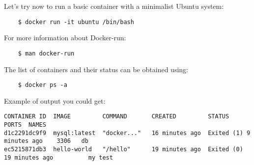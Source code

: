 \documentclass[handout]{beamer}[10pt, usepdftitle=false]
\begin{document}
	\begin{frame}[fragile]	
	
	Let's try now to run a basic container with a minimalist Ubuntu system:
	\vspace*{0.6em}
	
	\begin{verbatim}
	$ docker run -it ubuntu /bin/bash
	\end{verbatim}
	
	
	For more information about Docker-run:
	\vspace*{0.6em}	
	
	\begin{verbatim}
	$ man docker-run
	\end{verbatim}			
	
	The list of containers and their status can be obtained using:
	\vspace*{0.6em}
	
	\begin{verbatim}
	$ docker ps -a
	\end{verbatim}
	
	Example of output you could get:
	\vspace*{0.6em}
	
	\begingroup
    \fontsize{6pt}{12pt}\selectfont
	\begin{verbatim}
CONTAINER ID  IMAGE         COMMAND       CREATED         STATUS                      PORTS  NAMES
d1c2291dc9f9  mysql:latest  "docker..."   16 minutes ago  Exited (1) 9 minutes ago    3306   db
ec5215871db3  hello-world   "/hello"      19 minutes ago  Exited (0) 19 minutes ago          my test	
	\end{verbatim}
	\endgroup
		
	\end{frame}
\end{document}
